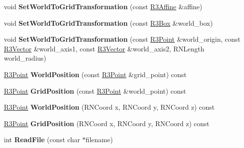 \begin{DoxyCompactItemize}
\item 
void {\bfseries Set\+World\+To\+Grid\+Transformation} (const \hyperlink{class_r3_affine}{R3\+Affine} \&affine)\hypertarget{class_r3_grid_a86c0e2ded3d7ef287b858160408aa148}{}\label{class_r3_grid_a86c0e2ded3d7ef287b858160408aa148}

\item 
void {\bfseries Set\+World\+To\+Grid\+Transformation} (const \hyperlink{class_r3_box}{R3\+Box} \&world\+\_\+box)\hypertarget{class_r3_grid_a695dae5b0c56c1d5edce91d6c4eb0bc9}{}\label{class_r3_grid_a695dae5b0c56c1d5edce91d6c4eb0bc9}

\item 
void {\bfseries Set\+World\+To\+Grid\+Transformation} (const \hyperlink{class_r3_point}{R3\+Point} \&world\+\_\+origin, const \hyperlink{class_r3_vector}{R3\+Vector} \&world\+\_\+axis1, const \hyperlink{class_r3_vector}{R3\+Vector} \&world\+\_\+axis2, R\+N\+Length world\+\_\+radius)\hypertarget{class_r3_grid_abc14c7eec9cb6034e501ccc3f9401dac}{}\label{class_r3_grid_abc14c7eec9cb6034e501ccc3f9401dac}

\item 
\hyperlink{class_r3_point}{R3\+Point} {\bfseries World\+Position} (const \hyperlink{class_r3_point}{R3\+Point} \&grid\+\_\+point) const \hypertarget{class_r3_grid_a3f3a5813a5547e0dc6bd8ef61e6b27d4}{}\label{class_r3_grid_a3f3a5813a5547e0dc6bd8ef61e6b27d4}

\item 
\hyperlink{class_r3_point}{R3\+Point} {\bfseries Grid\+Position} (const \hyperlink{class_r3_point}{R3\+Point} \&world\+\_\+point) const \hypertarget{class_r3_grid_ae0f6f25c04a349dc2a85294a2cce4787}{}\label{class_r3_grid_ae0f6f25c04a349dc2a85294a2cce4787}

\item 
\hyperlink{class_r3_point}{R3\+Point} {\bfseries World\+Position} (R\+N\+Coord x, R\+N\+Coord y, R\+N\+Coord z) const \hypertarget{class_r3_grid_a3b9b86350fc1798e92803171f085dd8a}{}\label{class_r3_grid_a3b9b86350fc1798e92803171f085dd8a}

\item 
\hyperlink{class_r3_point}{R3\+Point} {\bfseries Grid\+Position} (R\+N\+Coord x, R\+N\+Coord y, R\+N\+Coord z) const \hypertarget{class_r3_grid_a3b33a41e63be9bbbb528797fe31d79ce}{}\label{class_r3_grid_a3b33a41e63be9bbbb528797fe31d79ce}

\item 
int {\bfseries Read\+File} (const char $\ast$filename)\hypertarget{class_r3_grid_a8246372d28a7461dadc6ca720ae776b3}{}\label{class_r3_grid_a8246372d28a7461dadc6ca720ae776b3}


\end{DoxyCompactItemize}
